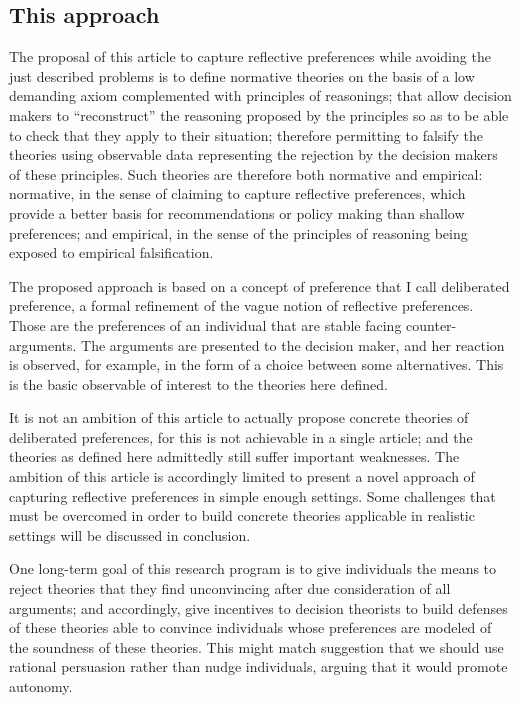 \documentclass[version=last, pagesize, twoside=off, bibliography=totoc, DIV=calc, fontsize=12pt, a4paper, french, english]{scrartcl}
\begin{document}
\subsection{This approach}
The proposal of this article to capture reflective preferences while avoiding the just described problems is to define normative theories on the basis of a low demanding axiom complemented with principles of reasonings; that allow decision makers to “reconstruct” the reasoning proposed by the principles so as to be able to check that they apply to their situation; therefore permitting to falsify the theories using observable data representing the rejection by the decision makers of these principles. Such theories are therefore both normative and empirical: normative, in the sense of claiming to capture reflective preferences, which provide a better basis for recommendations or policy making than shallow preferences; and empirical, in the sense of the principles of reasoning being exposed to empirical falsification.

The proposed approach is based on a concept of preference that I call deliberated preference, a formal refinement of the vague notion of reflective preferences. Those are the preferences of an individual that are stable facing counter-arguments. The arguments are presented to the decision maker, and her reaction is observed, for example, in the form of a choice between some alternatives. This is the basic observable of interest to the theories here defined.

It is not an ambition of this article to actually propose concrete theories of deliberated preferences, for this is not achievable in a single article; and the theories as defined here admittedly still suffer important weaknesses. The ambition of this article is accordingly limited to present a novel approach of capturing reflective preferences in simple enough settings.
Some challenges that must be overcomed in order to build concrete theories applicable in realistic settings will be discussed in conclusion.

One long-term goal of this research program is to give individuals the means to reject theories that they find unconvincing after due consideration of all arguments; and accordingly, give incentives to decision theorists to build defenses of these theories able to convince individuals whose preferences are modeled of the soundness of these theories. This might match  suggestion that we should use rational persuasion rather than nudge individuals, arguing that it would promote autonomy.
\end{document}
